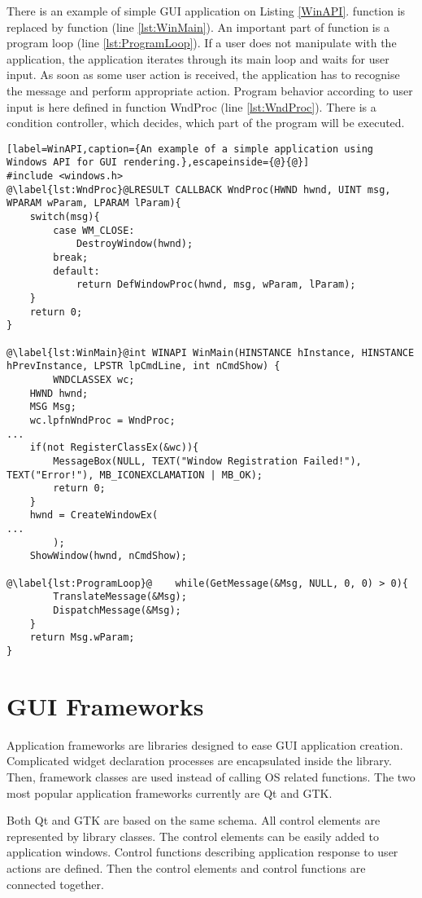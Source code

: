 There is an example of simple GUI application on Listing \ref{WinAPI}.  function is replaced by  function (line \ref{lst:WinMain}). An important part of  function is a program loop (line \ref{lst:ProgramLoop}). If a user does not manipulate with the application, the application iterates through its main loop and waits for user input. As soon as some user action is received, the application has to recognise the message and perform appropriate action. Program behavior according to user input is here defined in function WndProc (line \ref{lst:WndProc}). There is a condition controller, which decides, which part of the program will be executed.

\begin{lstlisting}[label=WinAPI,caption={An example of a simple application using Windows API for GUI rendering.},escapeinside={@}{@}]
#include <windows.h>
@\label{lst:WndProc}@LRESULT CALLBACK WndProc(HWND hwnd, UINT msg, WPARAM wParam, LPARAM lParam){
    switch(msg){
        case WM_CLOSE:
            DestroyWindow(hwnd);
        break;
        default:
            return DefWindowProc(hwnd, msg, wParam, lParam);
    }
    return 0;
}

@\label{lst:WinMain}@int WINAPI WinMain(HINSTANCE hInstance, HINSTANCE hPrevInstance, LPSTR lpCmdLine, int nCmdShow) {
		WNDCLASSEX wc;
    HWND hwnd;
    MSG Msg;
    wc.lpfnWndProc = WndProc;    
...
    if(not RegisterClassEx(&wc)){
        MessageBox(NULL, TEXT("Window Registration Failed!"), TEXT("Error!"), MB_ICONEXCLAMATION | MB_OK);
        return 0;
    }
    hwnd = CreateWindowEx(
...
		);
    ShowWindow(hwnd, nCmdShow);

@\label{lst:ProgramLoop}@    while(GetMessage(&Msg, NULL, 0, 0) > 0){
        TranslateMessage(&Msg);
        DispatchMessage(&Msg);
    }
    return Msg.wParam;
}
\end{lstlisting}

\section{GUI Frameworks}
\label{guiframeworks}
Application frameworks are libraries designed to ease GUI application creation. Complicated widget declaration processes are encapsulated inside the library. Then, framework classes are used instead of calling OS related functions. The two most popular application frameworks currently are Qt and GTK.

Both Qt and GTK are based on the same schema. All control elements are represented by library classes. The control elements can be easily added to application windows. Control functions describing application response to user actions are defined. Then the control elements and control functions are connected together.

